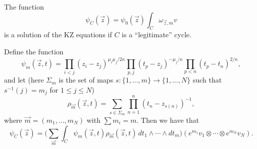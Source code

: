 \begin{theorem}
  The function
  \[
    \psi_C(\vec{z})
    = \psi_0(\vec{z}) \int_C \omega_{\vec{z}, m} v
  \]
  is a solution of the KZ equations if
  $C$ is a ``legitimate'' cycle.
\end{theorem}

\begin{remark}
  Define the function
  \[
    \psi_m(\vec{z}, t)
    = \prod_{i < j} (z_i - z_j)^{\mu_i \mu_j / 2 \kappa}
    \prod_{p, j} (t_p - z_j)^{-\mu_j / \kappa}
    \prod_{p < n} (t_p - t_n)^{2 / \kappa},
  \]
  \pagebreak
  and let (here
  $\Sigma_m$ is the set of maps
  $s : \{1, \dots, m\} \to \{1, \dots, N\}$
  such that $s^{-1}(j) = m_j$ for
  $1 \le j \le N$)
  \[
    \rho_{\vec{m}}(\vec{z}, t)
    = \sum_{s \in \Sigma_m} \prod_{n = 1}^n
    (t_n - z_{s(n)})^{-1},
  \]
  where $\vec{m} = (m_1, \dots, m_N)$ with
  $\sum m_i = m$.
  Then we have that
  \[
    \psi_C(\vec{z})
    = \bigg(\sum_{\vec{m}}
    \int_C \psi_m(\vec{z}, t) \rho_{\vec{m}}(\vec{z}, t)\, dt_1 \wedge \cdots \wedge dt_m\bigg)
    (e^{m_1} v_1 \otimes \cdots \otimes e^{m_N} v_N).
  \]
\end{remark}
